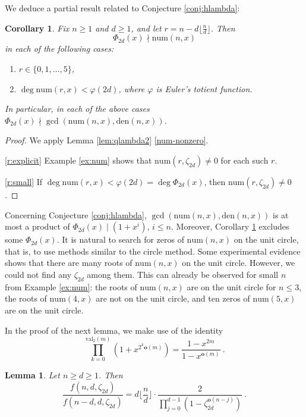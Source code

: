 \documentclass[reqno]{amsart}
\def\den{\mathrm{den}}
\def\num{\mathrm{num}}
\def\val{\mathrm{val}}
\def\o{\mathbf o}
\newtheorem{corollary}[theorem]{Corollary}
\newtheorem{lemma}[theorem]{Lemma}
\theoremstyle{definition}
\begin{document}
We deduce a partial result related to  Conjecture \ref{conj:hlambda}: 
\begin{corollary}\label{not-div-gcd} Fix  $n\geq 1$ and $d\geq 1$, and let $r=n-d\lfloor\frac{n}{d}\rfloor$. Then $$\Phi_{2d}(x)\nmid \num(n,x)$$ in each of the following cases:
\begin{enumerate}[label=(\alph*)]
    \item\label{r:explicit} $r\in\{0,1,\ldots,5\}$,
    \item\label{r:small} $\deg\num(r,x)<\varphi(2d)$, where $\varphi$ is Euler's totient function.
\end{enumerate}
In particular, in each of the above cases  $\Phi_{2d}(x)\nmid\gcd(\num(n,x),\den(n,x))$.
 \end{corollary}
\begin{proof} We apply Lemma  \ref{lem:qlambda2} \ref{num-nonzero}.

    \ref{r:explicit}  Example \ref{ex:num} shows that $\num(r,\zeta_{2d})\neq0$ for each such $r$.
   
    \ref{r:small} If $\deg\num(r,x)<\varphi(2d)=\deg\Phi_{2d}(x)$, then $\num(r,\zeta_{2d})\neq 0$.
\end{proof}
Concerning Conjecture \ref{conj:hlambda}, 
$\gcd(\num(n,x), \den(n,x))$
 is at most  a product of $\Phi_{2d}(x)\mid (1+x^i)$, $i\leq n$. Moreover, Corollary \ref{not-div-gcd} excludes some $\Phi_{2d}(x)$. It is natural to search for zeros of  $\num(n,x)$ on the unit circle, that is, to use methods similar to the circle method. Some experimental evidence shows that there are many roots of $\num(n,x)$    on the unit circle. However, we could not find any $\zeta_{2d}$ among them.
This can already be observed for small $n$ from Example \ref{ex:num}: the roots of $\num(n,x)$ are on the unit circle for $n\leq 3$, the roots of $\num(4,x)$ are not on the unit circle, and ten zeros of $\num(5,x)$ are on the unit circle.







In the proof of the next lemma, we make use of the identity \[\prod_{k=0}^{\val_2(m)}(1+x^{2^k\o(m)})= \frac{1-x^{2m}}{1-x^{\o(m)}} \:.\]





\begin{lemma}\label{lemma:zeta} Let $n\geq d\geq 1$. Then 
\[
\frac{f(n,d,\zeta_{2d})}{f(n-d,d,\zeta_{2d})}=d\lfloor \frac{n}{d}\rfloor \cdot 
\frac{2}{\prod_{j=0}^{d-1}(1-\zeta_{2d}^{\o(n-j)})}\:.
\]\end{lemma}
\end{document}
